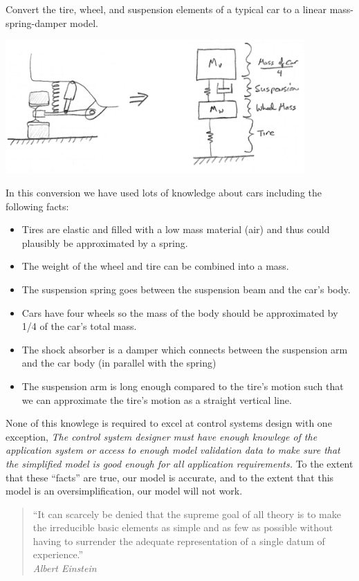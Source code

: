 \begin{Example}\label{ExampleCarSuspension}

Convert the tire, wheel, and suspension elements of a typical car to a linear mass-spring-damper model.


\includegraphics[width=4.5in]{figs02/00719a.png}


In this conversion we have used lots of knowledge about cars including the following facts:


 \begin{itemize}
   \item Tires are elastic and filled with a low mass material (air) and thus could plausibly be approximated by a spring.
   \item The weight of the wheel and tire can be combined into a mass.
   \item The suspension spring goes between the suspension beam and the car's body.
   \item Cars have four wheels so the mass of the body should be approximated by 1/4 of the car's total mass.
   \item The shock absorber is a damper which connects between the suspension arm and the car body (in parallel with the spring)
   \item The suspension arm is long enough compared to the tire's motion such that we can approximate the tire's motion as a straight vertical line.
 \end{itemize}


None of this knowlege is required to excel at control systems design with one exception, {\it The control system designer must have enough knowlege of the application system or access to enough model validation data to make sure that the simplified model is good enough for all application requirements. } To the extent that these ``facts'' are true, our model is accurate, and to the extent that this model is an oversimplification, our model will not work.


\begin{quotation}``It can scarcely be denied that the supreme goal of all theory is to make the irreducible basic elements as simple and as few as possible without having to surrender the adequate representation of a single datum of experience.'' \\
{\it Albert Einstein}
\end{quotation}

\end{Example}


